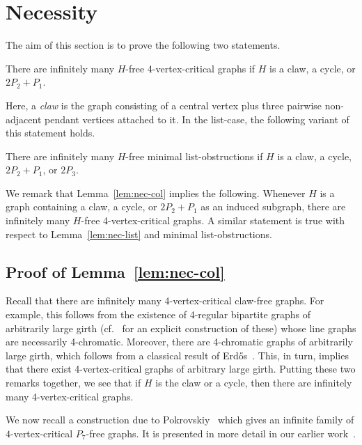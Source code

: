 \documentclass[11pt]{article}
\begin{document}
\section{Necessity}\label{sec:necessity}

The aim of this section is to prove the following two statements.

\begin{lemma}\label{lem:nec-col}
There are infinitely many $H$-free 4-vertex-critical graphs if 
$H$ is a claw, a cycle, or $2P_2+P_1$.
\end{lemma}

Here, a \emph{claw} is the graph consisting of a central vertex plus three pairwise non-adjacent pendant vertices attached to it.
In the list-case, the following variant of this statement holds.

\begin{lemma}\label{lem:nec-list}
There are infinitely many $H$-free minimal list-obstructions if 
$H$ is a claw, a cycle, $2P_2+P_1$, or $2P_3$.
\end{lemma}

We remark that Lemma~\ref{lem:nec-col} implies the following.
Whenever $H$ is a graph containing a claw, a cycle, or $2P_2+P_1$ as an induced subgraph, there are infinitely many $H$-free 4-vertex-critical graphs.
A similar statement is true with respect to Lemma~\ref{lem:nec-list} and minimal list-obstructions.

\subsection{Proof of Lemma~\ref{lem:nec-col}}

Recall that there are infinitely many 4-vertex-critical claw-free graphs.
For example, this follows from the existence of 4-regular bipartite graphs of arbitrarily large girth (cf.~\cite{LU95} for an explicit construction of these) whose line graphs are necessarily 4-chromatic.
Moreover, there are 4-chromatic graphs of arbitrarily large girth, which follows from a classical result of Erd\H{o}s~\cite{Erd59}.
This, in turn, implies that there exist 4-vertex-critical graphs of arbitrary large girth.
Putting these two remarks together, we see that if $H$ is the claw or a cycle, then there are infinitely many 4-vertex-critical graphs. 

We now recall a construction due to Pokrovskiy~\cite{Pok14} which gives an infinite family of $4$-vertex-critical $P_7$-free graphs.
It is presented in more detail in our earlier work~\cite{CGSZ15}.
\end{document}
